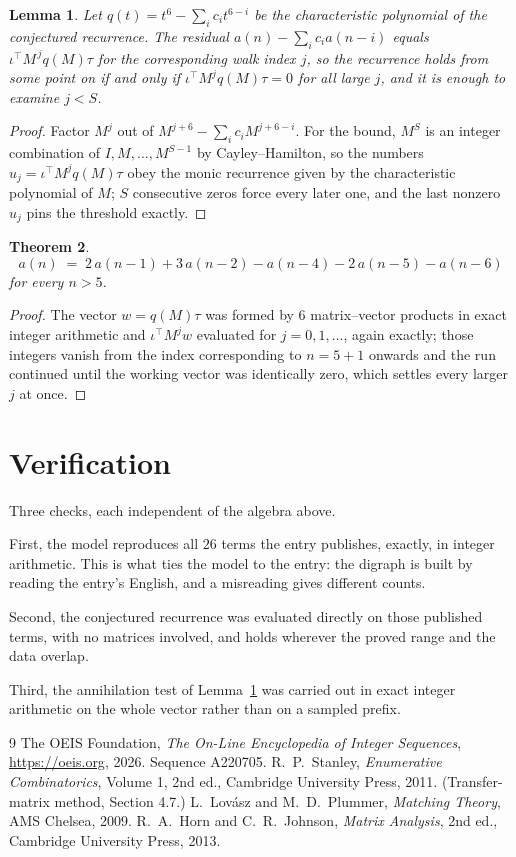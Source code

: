 \documentclass[11pt,a4paper]{article}
\theoremstyle{plain}
\newtheorem{theorem}{Theorem}
\newtheorem{lemma}[theorem]{Lemma}
\theoremstyle{definition}
\begin{document}
\begin{lemma}\label{lem:crit}
Let $q(t)=t^{6}-\sum_i c_it^{6-i}$ be the characteristic polynomial of the
conjectured recurrence. The residual $a(n)-\sum_ic_ia(n-i)$ equals
$\iota^{\!\top}M^{\,j}q(M)\tau$ for the corresponding walk index $j$, so the recurrence
holds from some point on if and only if $\iota^{\!\top}M^{j}q(M)\tau=0$ for all large $j$,
and it is enough to examine $j<S$.
\end{lemma}

\begin{proof}
Factor $M^{j}$ out of $M^{j+6}-\sum_ic_iM^{j+6-i}$. For the bound, $M^{S}$
is an integer combination of $I,M,\dots,M^{S-1}$ by Cayley--Hamilton, so the numbers
$u_j=\iota^{\!\top}M^{j}q(M)\tau$ obey the monic recurrence given by the characteristic
polynomial of $M$; $S$ consecutive zeros force every later one, and the last nonzero $u_j$
pins the threshold exactly.
\end{proof}

\begin{theorem}
\[
a(n)\;=\;2\,a(n-1) + 3\,a(n-2) - a(n-4) - 2\,a(n-5) - a(n-6)
\]
for every $n>5$.
\end{theorem}

\begin{proof}
The vector $w=q(M)\tau$ was formed by $6$ matrix--vector products in exact integer
arithmetic and $\iota^{\!\top}M^{j}w$ evaluated for $j=0,1,\dots$, again exactly; those
integers vanish from the index corresponding to $n=5+1$ onwards and the run continued
until the working vector was identically zero, which settles every larger $j$ at once.
\end{proof}

\section{Verification}

Three checks, each independent of the algebra above.

First, the model reproduces all $26$ terms the entry publishes, exactly, in integer
arithmetic. This is what ties the model to the entry: the digraph is built by reading the
entry's English, and a misreading gives different counts.

Second, the conjectured recurrence was evaluated directly on those published terms, with no
matrices involved, and holds wherever the proved range and the data overlap.

Third, the annihilation test of Lemma~\ref{lem:crit} was carried out in exact integer
arithmetic on the whole vector rather than on a sampled prefix.

\begin{thebibliography}{9}
 The OEIS Foundation, \emph{The On-Line Encyclopedia of Integer
Sequences}, \url{https://oeis.org}, 2026. Sequence A220705.
 R.~P.~Stanley, \emph{Enumerative Combinatorics}, Volume 1, 2nd ed.,
Cambridge University Press, 2011. (Transfer-matrix method, Section 4.7.)
 L.~Lov\'asz and M.~D.~Plummer, \emph{Matching Theory}, AMS Chelsea,
2009.
 R.~A.~Horn and C.~R.~Johnson, \emph{Matrix Analysis}, 2nd ed., Cambridge
University Press, 2013.
\end{thebibliography}
\end{document}
